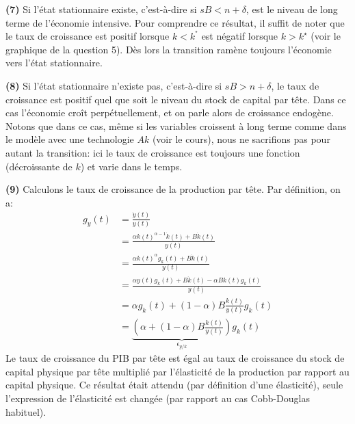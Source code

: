 \documentclass[10pt,a4paper,notitlepage]{article}
\newcommand{\question}[1]{\textbf{(#1)}}
\begin{document}
\question{7} Si l'état stationnaire existe, c'est-à-dire si
$sB<n+\delta$, est le niveau de long terme de l'économie
intensive. Pour comprendre ce résultat, il suffit de noter que le
taux de croissance est positif lorsque $k<k^{^{\star}}$ est négatif
lorsque $k>k^{\star}$ (voir le graphique de la question 5). Dès lors
la transition ramène toujours l'économie vers l'état
stationnaire.\newline

\question{8} Si l'état stationnaire n'existe pas, c'est-à-dire si
$sB>n+\delta$, le taux de croissance est positif quel que soit le
niveau du stock de capital par tête. Dans ce cas l'économie croît
perpétuellement, et on parle alors de croissance endogène. Notons que
dans ce cas, même si les variables croissent à long terme comme dans
le modèle avec une technologie $Ak$ (voir le cours), nous ne
sacrifions pas pour autant la transition: ici le taux de croissance
est toujours une fonction (décroissante de $k$) et varie dans le temps.\newline

\question{9} Calculons le taux de croissance de la production par
tête. Par définition, on a:
\[
\begin{split}
  g_y(t) &= \frac{\dot y(t)}{y(t)}\\
  &= \frac{\alpha k(t)^{\alpha-1}\dot k(t)+B\dot k(t)}{y(t)}\\
  &= \frac{\alpha k(t)^{\alpha} g_k(t) + B\dot k(t)}{y(t)}\\
  &= \frac{\alpha y(t) g_k(t) + B\dot k(t) - \alpha B k(t)g_k(t)}{y(t)}\\
  &= \alpha g_k(t) + (1-\alpha)B\frac{k(t)}{y(t)}g_k(t)\\
  &= \underset{\epsilon_{y/k}}{\underbrace{\left(\alpha + (1-\alpha)B\frac{k(t)}{y(t)}\right)}}g_k(t)
\end{split}
\]
Le taux de croissance du PIB par tête est égal au taux de croissance
du stock de capital physique par tête multiplié par l'élasticité de la
production par rapport au capital physique. Ce résultat était attendu
(par définition d'une élasticité), seule l'expression de l'élasticité
est changée (par rapport au cas Cobb-Douglas habituel).\newline
\end{document}
